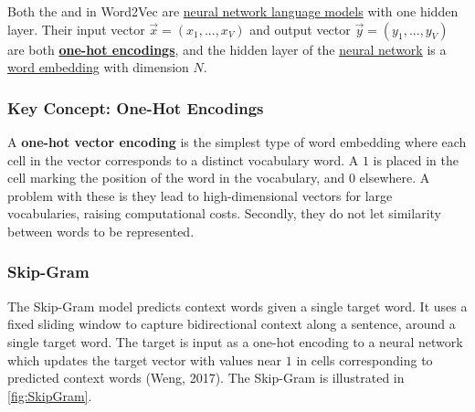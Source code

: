 Both the  and  in Word2Vec are \hyperref[sec:NeuralLM]{neural network language models} with one hidden layer.  Their input vector $\overrightarrow{x} = (x_1,..., x_V)$ and output vector $\overrightarrow{y} = (y_1,...,y_V)$ are both \textbf{\hyperref[sec:OneHotEncodings]{one-hot encodings}}, and the hidden layer of the \hyperref[sec:NeuralLM]{neural network} is a \hyperref[sec:WordEmbeddings]{word embedding} with dimension $N$. 

\subsubsection{Key Concept: One-Hot Encodings} \label{sec:OneHotEncodings}

A \textbf{one-hot vector encoding} is the simplest type of word embedding where each cell in the vector corresponds to a distinct vocabulary word. A $1$ is placed in the cell marking the position of the word in the vocabulary, and $0$ elsewhere. A problem with these is they lead to high-dimensional vectors for large vocabularies, raising computational costs. Secondly, they do not let similarity between words to be represented. 




\subsubsection{Skip-Gram} \label{sec:SkipGram}

The Skip-Gram model predicts context words given a single target word. It uses a fixed sliding window to capture bidirectional context along a sentence, around a single target word. The target is input as a one-hot encoding to a neural network which updates the target vector with values near $1$ in cells corresponding to predicted context words (Weng, 2017).  The Skip-Gram is illustrated in \cref{fig:SkipGram}.

